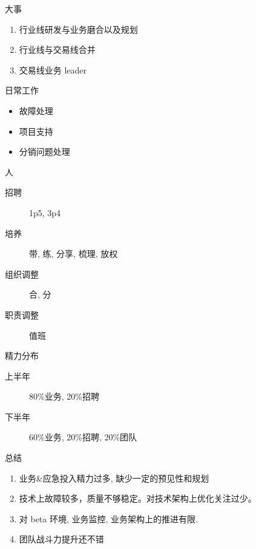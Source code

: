 \documentclass[presentation, bigger]{beamer}
\begin{document}
\begin{frame}[label={sec:org1d92f2d}]{大事}
\begin{enumerate}
\item 行业线研发与业务磨合以及规划
\item 行业线与交易线合并
\item 交易线业务 leader
\end{enumerate}
\end{frame}

\begin{frame}[label={sec:org7902654}]{日常工作}
\begin{itemize}
\item 故障处理
\item 项目支持
\item 分销问题处理
\end{itemize}
\end{frame}

\begin{frame}[label={sec:orgf85e779}]{人}
\begin{description}
\item[{招聘}] 1p5, 3p4
\item[{培养}] 带, 练, 分享, 梳理, 放权
\item[{组织调整}] 合, 分
\item[{职责调整}] 值班
\end{description}
\end{frame}

\begin{frame}[label={sec:org47c4e54}]{精力分布}
\begin{description}
\item[{上半年}] 80\%业务, 20\%招聘
\item[{下半年}] 60\%业务, 20\%招聘, 20\%团队
\end{description}
\end{frame}
\begin{frame}[label={sec:org7d55273}]{总结}
\begin{enumerate}
\item 业务\&应急投入精力过多, 缺少一定的预见性和规划
\item 技术上故障较多，质量不够稳定。对技术架构上优化关注过少。
\item 对 beta 环境, 业务监控, 业务架构上的推进有限.
\item 团队战斗力提升还不错
\end{enumerate}
\end{frame}
\end{document}
